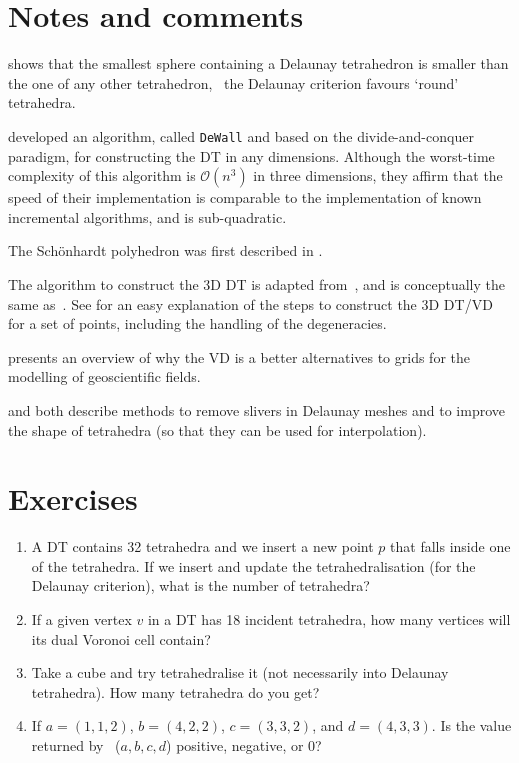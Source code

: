 %
\section{Notes and comments}

\citet{Rajan91} shows that the smallest sphere containing a Delaunay tetrahedron is smaller than the one of any other tetrahedron, \ie\ the Delaunay criterion favours `round' tetrahedra.

\citet{Cignoni98} developed an algorithm, called \texttt{DeWall} and based on the divide-and-conquer paradigm, for constructing the DT in any dimensions. Although the worst-time complexity of this algorithm is $\mathcal{O}(n^3)$ in three dimensions, they affirm that the speed of their implementation is comparable to the implementation of known incremental algorithms, and is sub-quadratic.

The Schönhardt polyhedron was first described in \citet{Schonhardt28}. 

The algorithm to construct the 3D DT is adapted from~\cite{Joe91}, and is conceptually the same as~\cite{Edelsbrunner96}. 
See \citet{Ledoux07} for an easy explanation of the steps to construct the 3D DT/VD for a set of points, including the handling of the degeneracies. 

\citet{Ledoux08} presents an overview of why the VD is a better alternatives to grids for the modelling of geoscientific fields.

\citet{Cheng00} and \citet{Miller02} both describe methods to remove slivers in Delaunay meshes and to improve the shape of tetrahedra (so that they can be used for interpolation).

%
\section{Exercises}

\begin{enumerate}
  \item A DT contains 32 tetrahedra and we insert a new point $p$ that falls inside one of the tetrahedra. If we insert and update the tetrahedralisation (for the Delaunay criterion), what is the number of tetrahedra?
  \item If a given vertex $v$ in a DT has 18 incident tetrahedra, how many vertices will its dual Voronoi cell contain?
  \item Take a cube and try tetrahedralise it (not necessarily into Delaunay tetrahedra). How many tetrahedra do you get?
  \item If $a = (1, 1, 2)$, $b = (4, 2, 2)$, $c = (3, 3, 2)$, and $d = (4, 3, 3)$. Is the value returned by \Orient~($a,b,c,d$) positive, negative, or 0?  
\end{enumerate}
